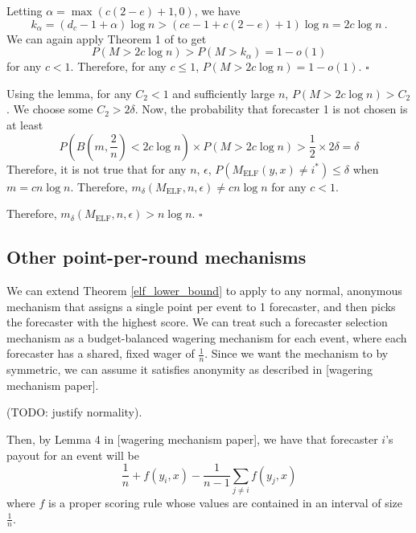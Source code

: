 \documentclass[letterpaper,12pt]{article}
\newcommand{\1}{\mathbbm{1}}
\newcommand*{\QED}{\hfill\ensuremath{\square}}%
\newcommand{\elf}{M_{\mathrm{ELF}}}
\begin{document}
Letting $\alpha = \max (c (2-e) + 1, 0)$, we have
\[
k_\alpha = (d_c - 1 + \alpha) \log n > (ce - 1 + c (2-e) + 1) \log n = 2c \log n \:.
\]
We can again apply Theorem 1 of \citet{raab1998balls} to get
\[
P(M > 2 c \log n) > P(M > k_\alpha) = 1 - o(1)
\]
for any $c < 1$. Therefore, for any $c \leq 1$, $P(M > 2 c \log n) = 1 - o(1)$. \hfill \QED

Using the lemma, for any $C_2 < 1$ and sufficiently large $n$, $P(M > 2 c \log n) > C_2$. We choose some $C_2 > 2\delta$. Now, the probability that forecaster 1 is not chosen is at least
\[
  P\left(B\left(m, \frac{2}{n}\right) < 2c \log n\right) \times P(M > 2 c \log n) > \frac{1}{2} \times 2\delta = \delta
\]
Therefore, it is not true that for any $n$, $\epsilon$, $P(\elf(y, x) \neq i^*) \leq \delta$ when $m = c n \log n$. Therefore, $m_\delta(\elf, n, \epsilon) \neq c n \log n$ for any $c < 1$. 

Therefore, $m_\delta(\elf, n, \epsilon) > n \log n$. 
\hfill \QED

\subsection{Other point-per-round mechanisms}
We can extend Theorem \ref{elf_lower_bound} to apply to any normal, anonymous mechanism that assigns a single point per event to 1 forecaster, and then picks the forecaster with the highest score. We can treat such a forecaster selection mechanism as a budget-balanced wagering mechanism for each event, where each forecaster has a shared, fixed wager of $\frac{1}{n}$. Since we want the mechanism to by symmetric, we can assume it satisfies anonymity as described in [wagering mechanism paper]. 

(TODO: justify normality).

Then, by Lemma 4 in [wagering mechanism paper], we have that forecaster $i$'s payout for an event will be 
\[
\frac{1}{n} + f(y_i, x) - \frac{1}{n-1} \sum_{j \neq i} f(y_j, x)
\]
where $f$ is a proper scoring rule whose values are contained in an interval of size $\frac{1}{n}$. 



\end{document}
